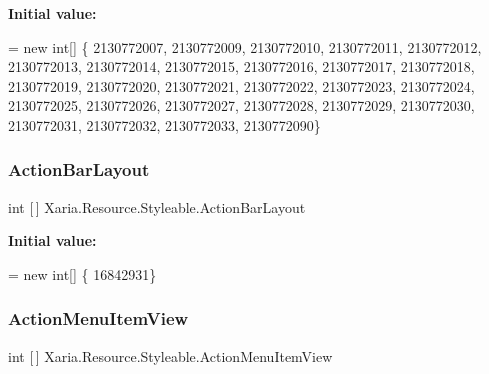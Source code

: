 {\bfseries Initial value\+:}
\begin{DoxyCode}
= \textcolor{keyword}{new} \textcolor{keywordtype}{int}[] \{
                    2130772007,
                    2130772009,
                    2130772010,
                    2130772011,
                    2130772012,
                    2130772013,
                    2130772014,
                    2130772015,
                    2130772016,
                    2130772017,
                    2130772018,
                    2130772019,
                    2130772020,
                    2130772021,
                    2130772022,
                    2130772023,
                    2130772024,
                    2130772025,
                    2130772026,
                    2130772027,
                    2130772028,
                    2130772029,
                    2130772030,
                    2130772031,
                    2130772032,
                    2130772033,
                    2130772090\}
\end{DoxyCode}
\mbox{\label{classXaria_1_1Resource_1_1Styleable_adedca514f598ccbbcf974555db5ab347}} 
\subsubsection{\texorpdfstring{Action\+Bar\+Layout}{ActionBarLayout}}
{\footnotesize\ttfamily int \mbox{[}$\,$\mbox{]} Xaria.\+Resource.\+Styleable.\+Action\+Bar\+Layout\hspace{0.3cm}{\ttfamily [static]}}

{\bfseries Initial value\+:}
\begin{DoxyCode}
= \textcolor{keyword}{new} \textcolor{keywordtype}{int}[] \{
                    16842931\}
\end{DoxyCode}
\mbox{\label{classXaria_1_1Resource_1_1Styleable_a6c6797ff637bf11a157f525a6c356706}} 
\subsubsection{\texorpdfstring{Action\+Menu\+Item\+View}{ActionMenuItemView}}
{\footnotesize\ttfamily int \mbox{[}$\,$\mbox{]} Xaria.\+Resource.\+Styleable.\+Action\+Menu\+Item\+View\hspace{0.3cm}{\ttfamily [static]}}

